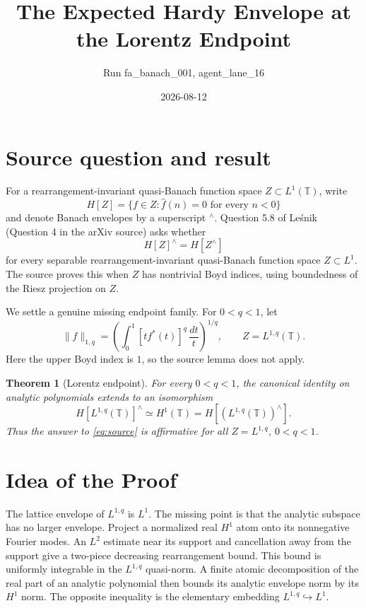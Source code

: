 \documentclass[11pt]{article}
\title{The Expected Hardy Envelope at the Lorentz Endpoint}
\author{Run fa\_banach\_001, agent\_lane\_16}
\date{2026-08-12}
\newtheorem{theorem}{Theorem}
\newcommand{\T}{\mathbb T}
\newcommand{\wh}[1]{\widehat{#1}}
\begin{document}
\maketitle

\section*{Source question and result}

For a rearrangement-invariant quasi-Banach function space $Z\subset L^1(\T)$,
write
\[
 H[Z]=\{f\in Z:\wh f(n)=0\text{ for every }n<0\}
\]
and denote Banach envelopes by a superscript ${}^{\wedge}$.  Question 5.8
of Le\'snik (Question 4 in the arXiv source) asks whether
\begin{equation}\label{eq:source}
 H[Z]^{\wedge}=H[Z^{\wedge}]
\end{equation}
for every separable rearrangement-invariant quasi-Banach function space
$Z\subset L^1$.  The source proves this when $Z$ has nontrivial Boyd
indices, using boundedness of the Riesz projection on $Z$.

We settle a genuine missing endpoint family.  For $0<q<1$, let
\[
 \|f\|_{1,q}=\left(\int_0^1[t f^*(t)]^q\,\frac{dt}{t}\right)^{1/q},
 \qquad Z=L^{1,q}(\T).
\]
Here the upper Boyd index is $1$, so the source lemma does not apply.

\begin{theorem}[Lorentz endpoint]\label{thm:main}
For every $0<q<1$, the canonical identity on analytic polynomials extends
to an isomorphism
\begin{equation}\label{eq:main}
 H[L^{1,q}(\T)]^{\wedge}\simeq H^1(\T)
 =H[(L^{1,q}(\T))^{\wedge}].
\end{equation}
Thus the answer to \eqref{eq:source} is affirmative for all
$Z=L^{1,q}$, $0<q<1$.
\end{theorem}

\section*{Idea of the Proof}

The lattice envelope of $L^{1,q}$ is $L^1$.  The missing point is that the
analytic subspace has no larger envelope.  Project a normalized real
$H^1$ atom onto its nonnegative Fourier modes.  An $L^2$ estimate near its
support and cancellation away from the support give a two-piece decreasing
rearrangement bound.  This bound is uniformly integrable in the
$L^{1,q}$ quasi-norm.  A finite atomic decomposition of the real part of an
analytic polynomial then bounds its analytic envelope norm by its $H^1$
norm.  The opposite inequality is the elementary embedding
$L^{1,q}\hookrightarrow L^1$.
\end{document}
